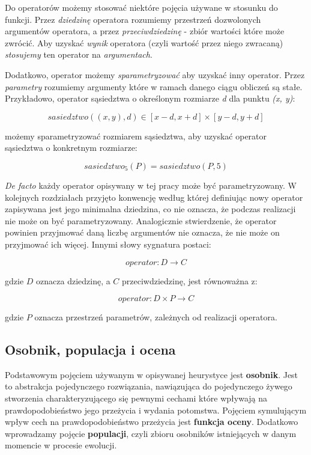 \documentclass[twoside]{iisthesis}
\newcommand{\Defacto}{\emph{De facto }}
\begin{document}
Do operatorów możemy stosować niektóre pojęcia używane w stosunku do funkcji. Przez \emph{dziedzinę} operatora rozumiemy przestrzeń dozwolonych argumentów operatora, a przez \emph{przeciwdziedzinę} - zbiór wartości które może zwrócić. Aby uzyskać \emph{wynik} operatora (czyli wartość przez niego zwracaną) \emph{stosujemy} ten operator na \emph{argumentach}.

Dodatkowo, operator możemy \emph{sparametryzować} aby uzyskać inny operator. Przez \emph{parametry} rozumiemy argumenty które w ramach danego ciągu obliczeń są stałe. Przykładowo, operator sąsiedztwa o określonym rozmiarze \emph{d} dla punktu \emph{(x, y)}:

\begin{displaymath}
	sasiedztwo((x, y), d) \in [x-d, x+d] \times [y-d, y+d]
\end{displaymath}

możemy sparametryzować rozmiarem sąsiedztwa, aby uzyskać operator sąsiedztwa o konkretnym rozmiarze:

\begin{displaymath}
sasiedztwo_5 (P) = sasiedztwo (P, 5)
\end{displaymath}

\Defacto każdy operator opisywany w tej pracy może być parametryzowany. W kolejnych rozdziałach przyjęto konwencję według której definiując nowy operator zapisywana jest jego minimalna dziedzina, co nie oznacza, że podczas realizacji nie może on być parametryzowany. Analogicznie stwierdzenie, że operator powinien przyjmować daną liczbę argumentów nie oznacza, że nie może on przyjmować ich więcej. Innymi słowy sygnatura postaci:

\begin{displaymath}
operator: D \rightarrow C
\end{displaymath}

gdzie $D$ oznacza dziedzinę, a $C$ przeciwdziedzinę, jest równoważna z:

\begin{displaymath}
operator: D \times P \rightarrow C
\end{displaymath}

gdzie $P$ oznacza przestrzeń parametrów, zależnych od realizacji operatora.

\subsection{Osobnik, populacja i ocena}

Podstawowym pojęciem używanym w opisywanej heurystyce jest \textbf{osobnik}. Jest to abstrakcja pojedynczego rozwiązania, nawiązująca do pojedynczego żywego stworzenia charakteryzującego się pewnymi cechami które wpływają na prawdopodobieństwo jego przeżycia i wydania potomstwa. Pojęciem symulującym wpływ cech na prawdopodobieństwo przeżycia jest \textbf{funkcja oceny}. Dodatkowo wprowadzamy pojęcie \textbf{populacji}, czyli zbioru osobników istniejących w danym momencie w procesie ewolucji.
\end{document}
